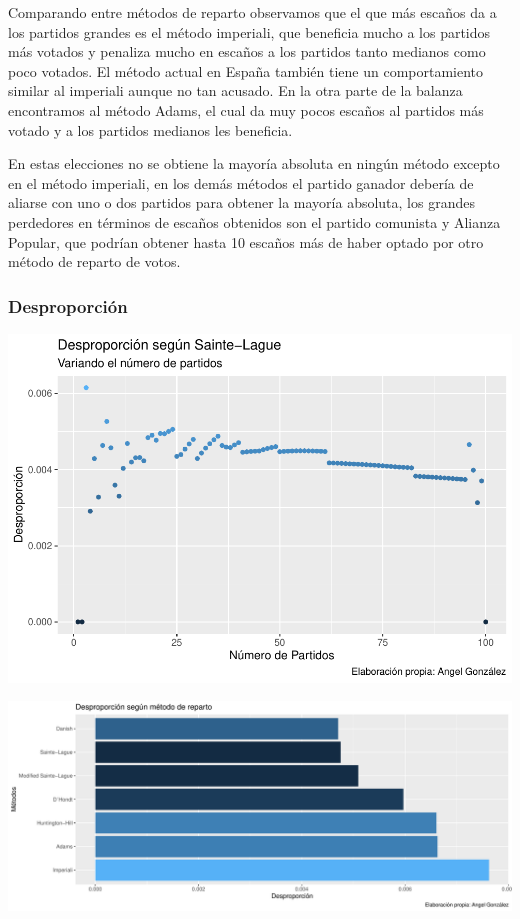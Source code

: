 \documentclass[12pt,a4paper,]{book}
\numberwithin{dummy}{section}
\theoremstyle{ocrenumbox}
\theoremstyle{blacknumex}
\theoremstyle{blacknumbox}
\theoremstyle{ocrenum}
\theoremstyle{ocrenum}
\begin{document}
Comparando entre métodos de reparto observamos que el que más escaños da
a los partidos grandes es el método imperiali, que beneficia mucho a los
partidos más votados y penaliza mucho en escaños a los partidos tanto
medianos como poco votados. El método actual en España también tiene un
comportamiento similar al imperiali aunque no tan acusado. En la otra
parte de la balanza encontramos al método Adams, el cual da muy pocos
escaños al partidos más votado y a los partidos medianos les beneficia.

En estas elecciones no se obtiene la mayoría absoluta en ningún método
excepto en el método imperiali, en los demás métodos el partido ganador
debería de aliarse con uno o dos partidos para obtener la mayoría
absoluta, los grandes perdedores en términos de escaños obtenidos son el
partido comunista y Alianza Popular, que podrían obtener hasta 10
escaños más de haber optado por otro método de reparto de votos.

\hypertarget{desproporciuxf3n}{%
\subsubsection{Desproporción}\label{desproporciuxf3n}}

\begin{center}\includegraphics[width=0.95\linewidth]{figurasR/unnamed-chunk-12-1} \end{center}

\begin{center}\includegraphics[width=0.95\linewidth]{figurasR/unnamed-chunk-12-2} \end{center}
\end{document}
